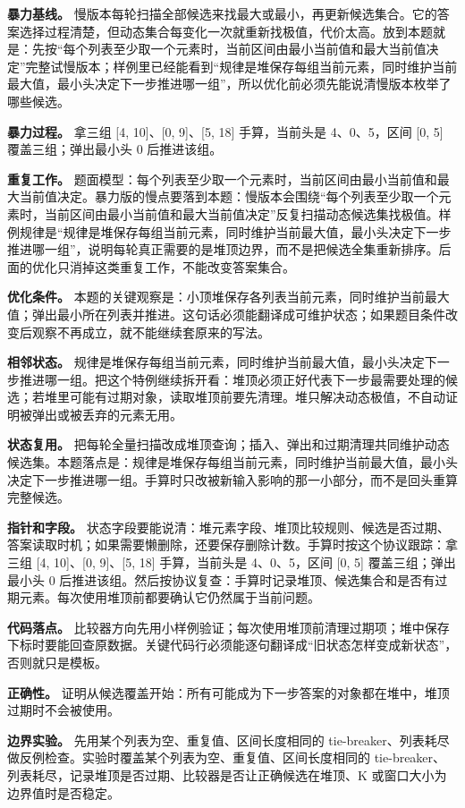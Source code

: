 \textbf{暴力基线。} 慢版本每轮扫描全部候选来找最大或最小，再更新候选集合。它的答案选择过程清楚，但动态集合每变化一次就重新找极值，代价太高。放到本题就是：先按“每个列表至少取一个元素时，当前区间由最小当前值和最大当前值决定”完整试慢版本；样例里已经能看到“规律是堆保存每组当前元素，同时维护当前最大值，最小头决定下一步推进哪一组”，所以优化前必须先能说清慢版本枚举了哪些候选。

\textbf{暴力过程。} 拿三组 [4, 10]、[0, 9]、[5, 18] 手算，当前头是 4、0、5，区间 [0, 5] 覆盖三组；弹出最小头 0 后推进该组。

\textbf{重复工作。} 题面模型：每个列表至少取一个元素时，当前区间由最小当前值和最大当前值决定。暴力版的慢点要落到本题：慢版本会围绕“每个列表至少取一个元素时，当前区间由最小当前值和最大当前值决定”反复扫描动态候选集找极值。样例规律是“规律是堆保存每组当前元素，同时维护当前最大值，最小头决定下一步推进哪一组”，说明每轮真正需要的是堆顶边界，而不是把候选全集重新排序。后面的优化只消掉这类重复工作，不能改变答案集合。

\textbf{优化条件。} 本题的关键观察是：小顶堆保存各列表当前元素，同时维护当前最大值；弹出最小所在列表并推进。这句话必须能翻译成可维护状态；如果题目条件改变后观察不再成立，就不能继续套原来的写法。

\textbf{相邻状态。} 规律是堆保存每组当前元素，同时维护当前最大值，最小头决定下一步推进哪一组。把这个特例继续拆开看：堆顶必须正好代表下一步最需要处理的候选；若堆里可能有过期对象，读取堆顶前要先清理。堆只解决动态极值，不自动证明被弹出或被丢弃的元素无用。

\textbf{状态复用。} 把每轮全量扫描改成堆顶查询；插入、弹出和过期清理共同维护动态候选集。本题落点是：规律是堆保存每组当前元素，同时维护当前最大值，最小头决定下一步推进哪一组。手算时只改被新输入影响的那一小部分，而不是回头重算完整候选。

\textbf{指针和字段。} 状态字段要能说清：堆元素字段、堆顶比较规则、候选是否过期、答案读取时机；如果需要懒删除，还要保存删除计数。手算时按这个协议跟踪：拿三组 [4, 10]、[0, 9]、[5, 18] 手算，当前头是 4、0、5，区间 [0, 5] 覆盖三组；弹出最小头 0 后推进该组。然后按协议复查：手算时记录堆顶、候选集合和是否有过期元素。每次使用堆顶前都要确认它仍然属于当前问题。

\textbf{代码落点。} 比较器方向先用小样例验证；每次使用堆顶前清理过期项；堆中保存下标时要能回查原数据。关键代码行必须能逐句翻译成“旧状态怎样变成新状态”，否则就只是模板。

\textbf{正确性。} 证明从候选覆盖开始：所有可能成为下一步答案的对象都在堆中，堆顶过期时不会被使用。

\textbf{边界实验。} 先用某个列表为空、重复值、区间长度相同的 tie-breaker、列表耗尽做反例检查。实验时覆盖某个列表为空、重复值、区间长度相同的 tie-breaker、列表耗尽，记录堆顶是否过期、比较器是否让正确候选在堆顶、K 或窗口大小为边界值时是否稳定。

